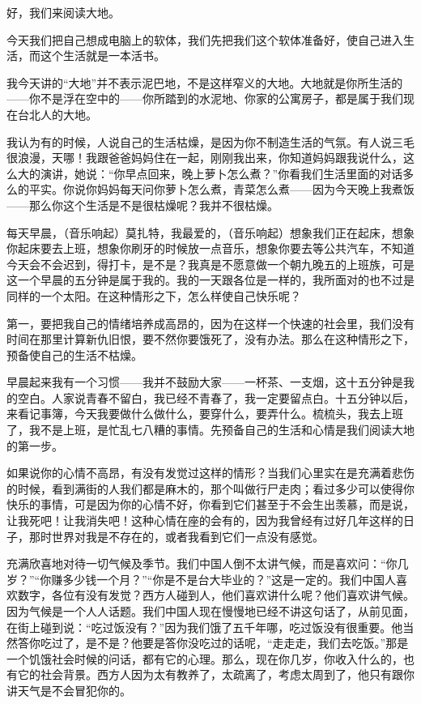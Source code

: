 \par 好，我们来阅读大地。
\par 今天我们把自己想成电脑上的软体，我们先把我们这个软体准备好，使自己进入生活，而这个生活就是一本活书。
\par 我今天讲的“大地”并不表示泥巴地，不是这样窄义的大地。大地就是你所生活的——你不是浮在空中的——你所踏到的水泥地、你家的公寓房子，都是属于我们现在台北人的大地。
\par 我认为有的时候，人说自己的生活枯燥，是因为你不制造生活的气氛。有人说三毛很浪漫，天哪！我跟爸爸妈妈住在一起，刚刚我出来，你知道妈妈跟我说什么，这么大的演讲，她说：“你早点回来，晚上萝卜怎么煮？”你看我们生活里面的对话多么的平实。你说你妈妈每天问你萝卜怎么煮，青菜怎么煮——因为今天晚上我煮饭——那么你这个生活是不是很枯燥呢？我并不很枯燥。
\par 每天早晨，（音乐响起）莫扎特，我最爱的，（音乐响起）想象我们正在起床，想象你起床要去上班，想象你刷牙的时候放一点音乐，想象你要去等公共汽车，不知道今天会不会迟到，得打卡，是不是？我真是不愿意做一个朝九晚五的上班族，可是这一个早晨的五分钟是属于我的。我的一天跟各位是一样的，我所面对的也不过是同样的一个太阳。在这种情形之下，怎么样使自己快乐呢？
\par 第一，要把我自己的情绪培养成高昂的，因为在这样一个快速的社会里，我们没有时间在那里计算新仇旧恨，要不然你要饿死了，没有办法。那么在这种情形之下，预备使自己的生活不枯燥。
\par 早晨起来我有一个习惯——我并不鼓励大家——一杯茶、一支烟，这十五分钟是我的空白。人家说青春不留白，我已经不青春了，我一定要留点白。十五分钟以后，来看记事簿，今天我要做什么做什么，要穿什么，要弄什么。梳梳头，我去上班了，我不是上班，是忙乱七八糟的事情。先预备自己的生活和心情是我们阅读大地的第一步。
\par 如果说你的心情不高昂，有没有发觉过这样的情形？当我们心里实在是充满着悲伤的时候，看到满街的人我们都是麻木的，那个叫做行尸走肉；看过多少可以使得你快乐的事情，可是因为你的心情不好，你看到它们甚至于不会生出羡慕，而是说，让我死吧！让我消失吧！这种心情在座的会有的，因为我曾经有过好几年这样的日子，那时世界对我是不存在的，或者我看到它们一点没有感觉。
\par 充满欣喜地对待一切气候及季节。我们中国人倒不太讲气候，而是喜欢问：“你几岁？”“你赚多少钱一个月？”“你是不是台大毕业的？”这是一定的。我们中国人喜欢数字，各位有没有发觉？西方人碰到人，他们喜欢讲什么呢？他们喜欢讲气候。因为气候是一个人人话题。我们中国人现在慢慢地已经不讲这句话了，从前见面，在街上碰到说：“吃过饭没有？”因为我们饿了五千年哪，吃过饭没有很重要。他当然答你吃过了，是不是？他要是答你没吃过的话呢，“走走走，我们去吃饭。”那是一个饥饿社会时候的问话，都有它的心理。那么，现在你几岁，你收入什么的，也有它的社会背景。西方人因为太有教养了，太疏离了，考虑太周到了，他只有跟你讲天气是不会冒犯你的。
